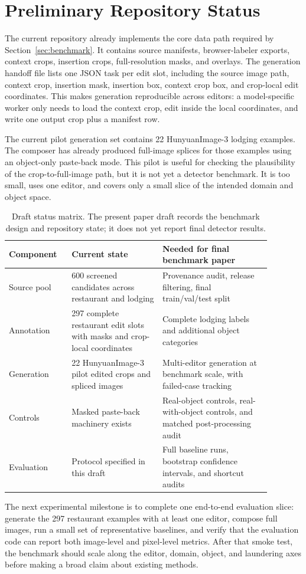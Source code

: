 \section{Preliminary Repository Status}

The current repository already implements the core data path required by Section~\ref{sec:benchmark}. It contains source manifests, browser-labeler exports, context crops, insertion crops, full-resolution masks, and overlays. The generation handoff file lists one JSON task per edit slot, including the source image path, context crop, insertion mask, insertion box, context crop box, and crop-local edit coordinates. This makes generation reproducible across editors: a model-specific worker only needs to load the context crop, edit inside the local coordinates, and write one output crop plus a manifest row.

The current pilot generation set contains 22 HunyuanImage-3 lodging examples. The composer has already produced full-image splices for those examples using an object-only paste-back mode. This pilot is useful for checking the plausibility of the crop-to-full-image path, but it is not yet a detector benchmark. It is too small, uses one editor, and covers only a small slice of the intended domain and object space.

\begin{table}[t]
\centering
\small
\begin{tabular}{p{0.20\linewidth}p{0.31\linewidth}p{0.37\linewidth}}
\toprule
Component & Current state & Needed for final benchmark paper \\
\midrule
Source pool & 600 screened candidates across restaurant and lodging & Provenance audit, release filtering, final train/val/test split \\
Annotation & 297 complete restaurant edit slots with masks and crop-local coordinates & Complete lodging labels and additional object categories \\
Generation & 22 HunyuanImage-3 pilot edited crops and spliced images & Multi-editor generation at benchmark scale, with failed-case tracking \\
Controls & Masked paste-back machinery exists & Real-object controls, real-with-object controls, and matched post-processing audit \\
Evaluation & Protocol specified in this draft & Full baseline runs, bootstrap confidence intervals, and shortcut audits \\
\bottomrule
\end{tabular}
\caption{Draft status matrix. The present paper draft records the benchmark design and repository state; it does not yet report final detector results.}
\label{tab:status}
\end{table}

The next experimental milestone is to complete one end-to-end evaluation slice: generate the 297 restaurant examples with at least one editor, compose full images, run a small set of representative baselines, and verify that the evaluation code can report both image-level and pixel-level metrics. After that smoke test, the benchmark should scale along the editor, domain, object, and laundering axes before making a broad claim about existing methods.
